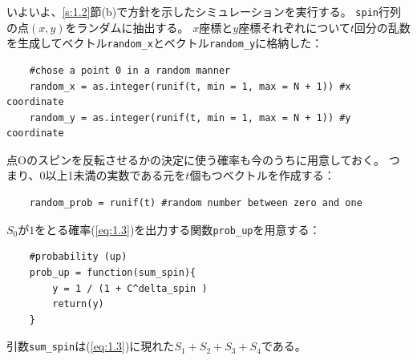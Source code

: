 \documentclass[fontsize = 12pt]{jlreq}
\begin{document}
いよいよ、\ref{s:1.2}節(b)で方針を示したシミュレーションを実行する。
\texttt{spin}行列の点$(x, y)$をランダムに抽出する。
$x$座標と$y$座標それぞれについて$t$回分の乱数を生成してベクトル\texttt{random\_x}とベクトル\texttt{random\_y}に格納した：
\begin{lstlisting}
    #chose a point 0 in a random manner
    random_x = as.integer(runif(t, min = 1, max = N + 1)) #x coordinate
    random_y = as.integer(runif(t, min = 1, max = N + 1)) #y coordinate
\end{lstlisting}
点Oのスピンを反転させるかの決定に使う確率も今のうちに用意しておく。
つまり、0以上1未満の実数である元を$t$個もつベクトルを作成する：
\begin{lstlisting}
    random_prob = runif(t) #random number between zero and one
\end{lstlisting}

$S_0$が$1$をとる確率(\ref{eq:1.3})を出力する関数\texttt{prob\_up}を用意する：
\begin{lstlisting}
    #probability (up)
    prob_up = function(sum_spin){
        y = 1 / (1 + C^delta_spin )
        return(y)
    }
\end{lstlisting}
引数\texttt{sum\_spin}は(\ref{eq:1.3})に現れた$S_1 + S_2 + S_3 + S_4 $である。
\end{document}
